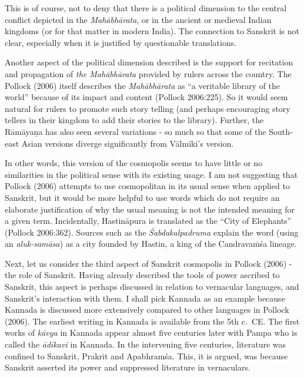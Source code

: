 This is of course, not to deny that there is a political dimension to the central conflict depicted in the {\sl Mahābhārata}, or in the ancient or medieval Indian kingdoms (or for that matter in modern India). The connection to Sanskrit is not clear, especially when it is justified by questionable translations.

Another aspect of the political dimension described is the support for recitation and propagation of {\sl the Mahābhārata} provided by rulers across the country. The Pollock (2006) itself describes the {\sl Mahābhārata} as “a veritable library of the world” because of its impact and content (Pollock 2006:225). So it would seem natural for rulers to promote such story telling (and perhaps encouraging story tellers in their kingdom to add their stories to the library).  Further, the Rāmāyaṇa has also seen several variations - so much so that some of the South-east Asian versions diverge significantly from Vālmīki’s version. 

In other words, this version of the cosmopolis seems to have little or no similarities in the political sense with its existing usage. I am not suggesting that Pollock (2006) attempts to use cosmopolitan in its usual sense when applied to Sanskrit, but it would be more helpful to use words which do not require an elaborate justification of why the usual meaning is not the intended meaning for a given term. Incidentally, Hastināpura is translated as the “City of Elephants” (Pollock 2006:362). Sources such as the {\sl Śabdakalpadruma} explain the word (using an {\sl aluk-samāsa}) as a city founded by Hastin, a king of the Candravaṁśa lineage.

Next, let us consider the third aspect of Sanskrit cosmopolis in Pollock (2006) - the role of Sanskrit. Having already described the tools of power ascribed to Sanskrit, this aspect is perhaps discussed in relation to vernacular languages, and Sanskrit’s interaction with them. I shall pick Kannada as an example because Kannada is discussed more extensively compared to other languages in Pollock (2006). The earliest writing in Kannada is available from the 5th c.\ CE. The first works of {\sl kāvya} in Kannada appear almost five centuries later with Pampa who is called the {\sl ādikavi} in Kannada. In the intervening five centuries, literature was confined to Sanskrit, Prakrit and Apabhramśa. This, it is argued, was because Sanskrit asserted its power and suppressed literature in vernaculars.

